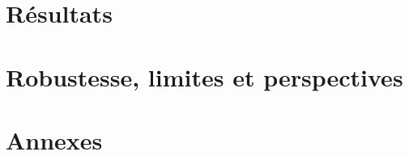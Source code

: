 \documentclass[12pt,a4paper]{report}
\begin{document}
\part{Résultats}
\label{part:resultats}

\part{Robustesse, limites et perspectives}
\label{part:limites}


\appendix
\part*{Annexes}

\end{document}
